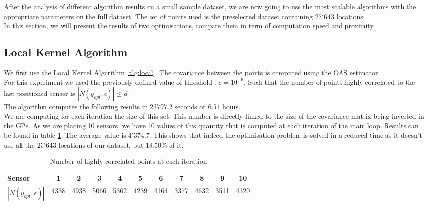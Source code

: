 After the analysis of different algorithm results on a small sample dataset, we are now going to use the most scalable algorithms with the appropriate parameters on the full dataset. The set of points used is the preselected dataset containing $23'643$ locations. \\

In this section, we will present the results of two optimisations, compare them in term of computation speed and proximity. 

\subsection{Local Kernel Algorithm} \label{sec:res:localK}

We first use the Local Kernel Algorithm \ref{alg:local}. The covariance between the points is computed using the OAS estimator. \\


For this experiment we used the previously defined value of threshold : $\epsilon = 10^{-6}$. Such that the number of points highly correlated to the last positioned sensor is $|N(y_{opt},\epsilon)| \leq d $. \\ 

The algorithm computes the following results in $23797.2$ seconds or $6.61$ hours. \\

We are computing for each iteration the size of this set. This number is directly linked to the size of the covariance matrix being inverted in the GPs. As we are placing 10 sensors, we have 10 values of this quantity that is computed at each iteration of the main loop. Results can be found in table \ref{tab:full:d_opt}. The average value is $4'374.7$. This shows that indeed the optimisation problem is solved in a reduced time as it doesn't use all the $23'643$ locations of our dataset, but $18.50$\% of it.   \\

\begin{table}[h]
    \centering
    \begin{tabular}{l|cccccccccc}
    \toprule
    Sensor & 1 & 2 & 3 & 4 & 5 & 6 & 7 & 8 & 9 & 10 \\     \midrule
        $|N(y_{opt},\epsilon)|$ & 4338 & 4938 & 5066 & 5362 & 4239 & 4164 & 3377 & 4632 & 3511 & 4120 \\     \bottomrule

    \end{tabular}
    \caption{Number of highly correlated points at each iteration}
    \label{tab:full:d_opt}
\end{table}


